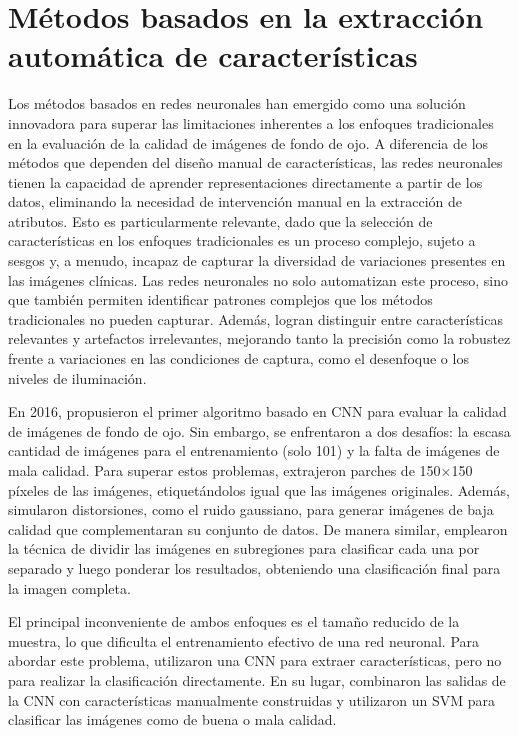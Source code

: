 \section{Métodos basados en la extracción automática de características}
Los métodos basados en redes neuronales han emergido como una solución innovadora para superar las limitaciones inherentes a los enfoques tradicionales en la evaluación de la calidad de imágenes de fondo de ojo. A diferencia de los métodos que dependen del diseño manual de características, las redes neuronales tienen la capacidad de aprender representaciones directamente a partir de los datos, eliminando la necesidad de intervención manual en la extracción de atributos. Esto es particularmente relevante, dado que la selección de características en los enfoques tradicionales es un proceso complejo, sujeto a sesgos y, a menudo, incapaz de capturar la diversidad de variaciones presentes en las imágenes clínicas. Las redes neuronales no solo automatizan este proceso, sino que también permiten identificar patrones complejos que los métodos tradicionales no pueden capturar. Además, logran distinguir entre características relevantes y artefactos irrelevantes, mejorando tanto la precisión como la robustez frente a variaciones en las condiciones de captura, como el desenfoque o los niveles de iluminación.

En 2016, \cite{mahapatra2016} propusieron el primer algoritmo basado en CNN para evaluar la calidad de imágenes de fondo de ojo. Sin embargo, se enfrentaron a dos desafíos: la escasa cantidad de imágenes para el entrenamiento (solo 101) y la falta de imágenes de mala calidad. Para superar estos problemas, extrajeron parches de 150×150 píxeles de las imágenes, etiquetándolos igual que las imágenes originales. Además, simularon distorsiones, como el ruido gaussiano, para generar imágenes de baja calidad que complementaran su conjunto de datos. De manera similar, \cite{costa2017eyequal} emplearon la técnica de dividir las imágenes en subregiones para clasificar cada una por separado y luego ponderar los resultados, obteniendo una clasificación final para la imagen completa.

El principal inconveniente de ambos enfoques es el tamaño reducido de la muestra, lo que dificulta el entrenamiento efectivo de una red neuronal. Para abordar este problema, \cite{yu2017image} utilizaron una CNN para extraer características, pero no para realizar la clasificación directamente. En su lugar, combinaron las salidas de la CNN con características manualmente construidas y utilizaron un SVM para clasificar las imágenes como de buena o mala calidad.

